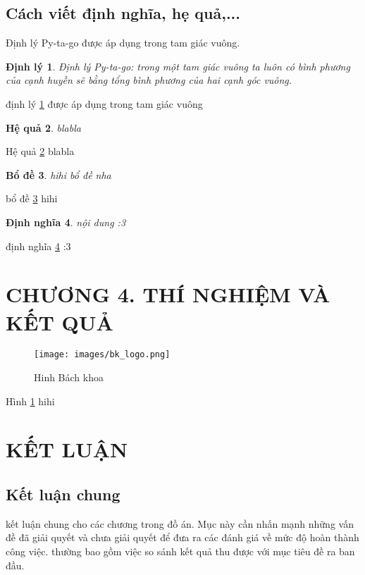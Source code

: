 \documentclass{article}
\newtheorem{theorem}{Định lý}
\newtheorem{defn}[theorem]{Định nghĩa}
\newtheorem{corollary}[theorem]{Hệ quả}
\newtheorem{lemma}[theorem]{Bổ đề}
\begin{document}
\subsection{Cách viết định nghĩa, hẹ quả,...}
Định lý Py-ta-go được áp dụng trong tam giác vuông.
\begin{theorem}\label{dlptg} %
Định lý Py-ta-go: trong một tam giác vuông ta luôn có bình phương của cạnh huyền sẽ bằng tổng bình phương của hai cạnh góc vuông.
\end{theorem}
định lý \ref{dlptg} được áp dụng trong tam giác vuông

\begin{corollary}\label{corol}
blabla

\end{corollary}
Hệ quả \ref{corol} blabla

\begin{lemma}\label{lemma}
hihi bổ đề nha
\end{lemma}
bổ đề \ref{lemma} hihi

\begin{defn}\label{defn}
nội dung :3
\end{defn}
định nghĩa \ref{defn} :3
\newpage

\section*{CHƯƠNG 4. THÍ NGHIỆM VÀ KẾT QUẢ}
{}
\setcounter{section}{4}
\setcounter{subsection}{0}
\setcounter{figure}{0}
\setcounter{table}{0}
\lipsum[] 
\begin{figure}[H]
    \centering
    \texttt{[image: images/bk\_logo.png]}
    \label{Hinh41}
    \caption{Hinh Bách khoa}
\end{figure}
Hình \ref{Hinh41} hihi
\cleardoublepage

\section*{KẾT LUẬN}
{}
\subsection*{Kết luận chung}
kết luận chung cho các chương trong đồ án. Mục này cần nhấn mạnh những vấn đề đã giải quyết và chưa giải quyết để đưa ra các đánh giá về mức độ hoàn thành công việc. thường bao gồm việc so sánh kết quả thu được với mục tiêu đề ra ban đầu.
\end{document}
